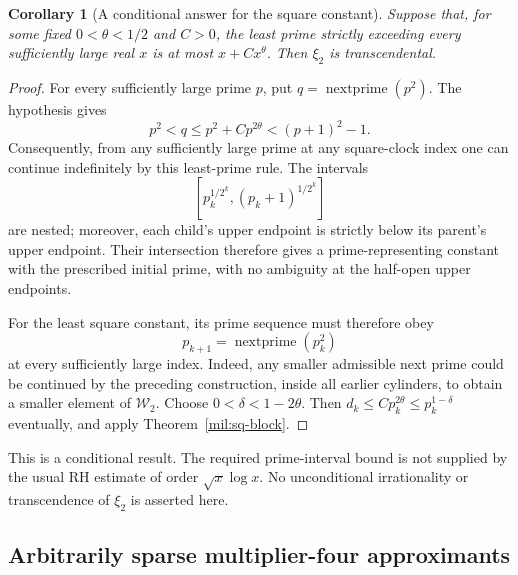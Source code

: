 \documentclass[11pt,a4paper]{article}
\newtheorem{corollary}[theorem]{Corollary}
\theoremstyle{definition}
\theoremstyle{remark}
\numberwithin{equation}{section}
\begin{document}
\begin{corollary}[A conditional answer for the square constant]
\label{mil:sq-gap-corollary}
Suppose that, for some fixed $0<\theta<1/2$ and $C>0$, the least
prime strictly exceeding every sufficiently large real $x$ is at
most $x+Cx^\theta$. Then $\xi_2$ is transcendental.
\end{corollary}
\begin{proof}
For every sufficiently large prime $p$, put
$q=\operatorname{nextprime}(p^2)$. The hypothesis gives
\[
 p^2<q\le p^2+Cp^{2\theta}<(p+1)^2-1.
\]
Consequently, from any sufficiently large prime at any square-clock
index one can continue indefinitely by this least-prime rule.
The intervals
\[
 [p_k^{1/2^k},(p_k+1)^{1/2^k}]
\]
are nested; moreover, each child's upper endpoint is strictly
below its parent's upper endpoint. Their intersection therefore
gives a prime-representing constant with the prescribed initial
prime, with no ambiguity at the half-open upper endpoints.

For the least square constant, its prime sequence must therefore
obey
\[
 p_{k+1}=\operatorname{nextprime}(p_k^2)
\]
at every sufficiently large index. Indeed, any smaller admissible next prime could be
continued by the preceding construction, inside all earlier
cylinders, to obtain a smaller element of $\mathcal W_2$.
Choose $0<\delta<1-2\theta$. Then
$d_k\le Cp_k^{2\theta}\le p_k^{1-\delta}$ eventually, and apply
Theorem~\ref{mil:sq-block}.
\end{proof}

This is a conditional result. The required prime-interval bound is
not supplied by the usual RH estimate of order $\sqrt{x}\log x$.
No unconditional irrationality or transcendence of $\xi_2$ is
asserted here.

\subsection{Arbitrarily sparse multiplier-four approximants}
\end{document}
